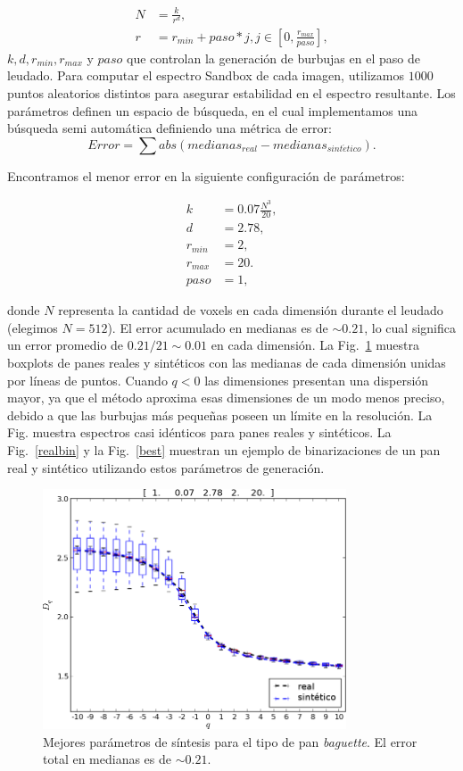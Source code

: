 \begin{align*}
N &= \frac{k}{r^{d}},\\ r &= r_{min}+paso*j, j \in [0,\frac{r_{max}}{paso}],
\end{align*}
\noindent $k,d,r_{min},r_{max}$ y $paso$ que controlan la generación de burbujas en el paso de leudado.
Para computar el espectro Sandbox de cada imagen, utilizamos $1000$ puntos aleatorios distintos para asegurar estabilidad en el espectro resultante.
Los parámetros definen un espacio de búsqueda, en el cual implementamos una búsqueda semi automática definiendo una métrica de error:
\begin{equation*}
Error = \displaystyle \sum abs(medianas_{real}-medianas_{sint\acute{e}tico}).
\end{equation*}

Encontramos el menor error en la siguiente configuración de parámetros:

\begin{align*}
k &= 0.07 \frac{N^{3}}{20} ,\\
d &=2.78,\\
r_{min} &=2,\\
r_{max} &=20.\\
paso &=1,
\end{align*}

\noindent donde $N$ representa la cantidad de voxels en cada dimensión durante el leudado (elegimos $N = 512$). 
El error acumulado en medianas es de $\sim 0.21$, lo cual significa un error promedio de $0.21/21 \sim 0.01$ en cada dimensión.
La Fig.~\ref{bestboxplot} muestra boxplots de panes reales y sintéticos con las medianas de cada dimensión unidas por líneas de puntos.
Cuando $q < 0$ las dimensiones presentan una dispersión mayor, ya que el método aproxima esas dimensiones de un modo menos preciso, debido a que las burbujas más pequeñas poseen un límite en la resolución.
La Fig. muestra espectros casi idénticos para panes reales y sintéticos.
La Fig.~\ref{realbin} y la Fig.~\ref{best} muestran un ejemplo de binarizaciones de un pan real y sintético utilizando estos parámetros de generación.


\begin{figure}[!ht]
\centerline{\includegraphics[width=9cm]{figures/bestboxplot}}
\caption[Mejores parámetros de síntesis para el tipo de pan {\em baguette}]{Mejores parámetros de síntesis para el tipo de pan {\em baguette}. El error total en medianas es de $\sim 0.21$.}
\label{bestboxplot}
\end{figure}


